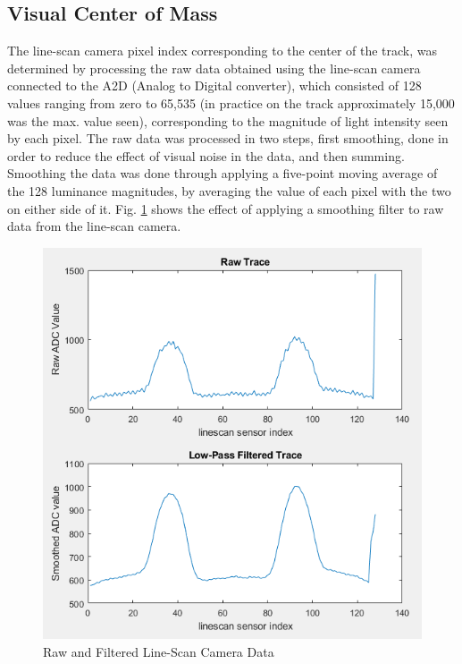 \documentclass{article}
\begin{document}
\subsection{Visual Center of Mass}
The line-scan camera pixel index corresponding to the center of the track, was determined by processing the raw data obtained using the line-scan camera connected to the A2D (Analog to Digital converter), which consisted of 128 values ranging from zero to 65,535 (in practice on the track approximately 15,000 was the max. value seen), corresponding to the magnitude of light intensity seen by each pixel. The raw data was processed in two steps, first smoothing, done in order to reduce the effect of visual noise in the data, and then summing. Smoothing the data was done through applying a five-point moving average of the 128 luminance magnitudes, by averaging the value of each pixel with the two on either side of it. Fig. \ref{fig-lineScanOutput} shows the effect of applying a smoothing filter to raw data from the line-scan camera.  

\begin{figure}[htbp]
  \centering
  \includegraphics[width=\linewidth]{figs/croppedLab5MATLAB.png}
  \caption[Short caption]{Raw and Filtered Line-Scan Camera Data \cite{ourLab5} \fontsize{8pt}{10pt}\selectfont}
  \label{fig-lineScanOutput}
\end{figure}
\end{document}
